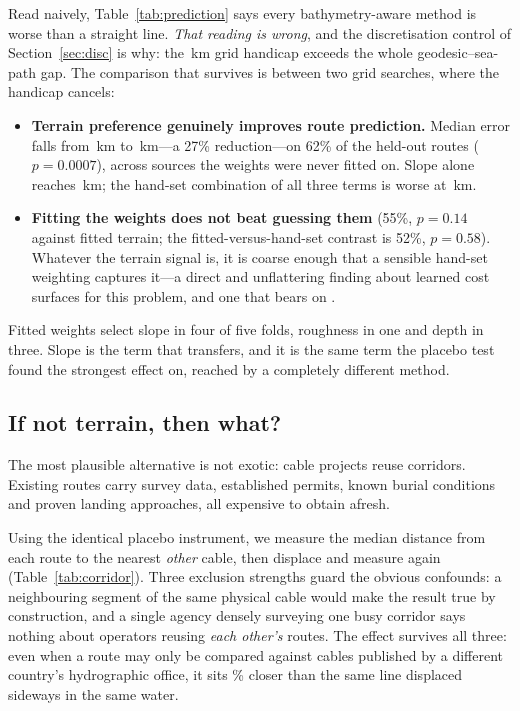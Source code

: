 \documentclass[journal]{IEEEtran}
\begin{document}
Read naively, Table~\ref{tab:prediction} says every bathymetry-aware method is
worse than a straight line. \emph{That reading is wrong}, and the
discretisation control of Section~\ref{sec:disc} is why: the
\nDiscretisation\,km grid handicap exceeds the whole geodesic--sea-path gap.
The comparison that survives is between two grid searches, where the handicap
cancels:

\begin{itemize}
\item \textbf{Terrain preference genuinely improves route prediction.} Median
error falls from \nRegSeapath\,km to \nRegFitted\,km---a 27\% reduction---on
62\% of the \nRegN{} held-out routes ($p=0.0007$), across sources the weights
were never fitted on. Slope alone reaches \nRegSlope\,km; the hand-set
combination of all three terms is worse at \nRegHandset\,km.
\item \textbf{Fitting the weights does not beat guessing them}
(55\%, $p=0.14$ against fitted terrain; the fitted-versus-hand-set contrast is
52\%, $p=0.58$). Whatever the terrain signal is, it is coarse enough that a
sensible hand-set weighting captures it---a direct and unflattering finding
about learned cost surfaces for this problem, and one that bears on
\cite{google_patent_2021}.
\end{itemize}

Fitted weights select slope in four of five folds, roughness in one and depth
in three. Slope is the term that transfers, and it is the same term the placebo
test found the strongest effect on, reached by a completely different method.

\subsection{If not terrain, then what?}\label{sec:corridor}
The most plausible alternative is not exotic: cable projects reuse corridors.
Existing routes carry survey data, established permits, known burial conditions
and proven landing approaches, all expensive to obtain afresh.

Using the identical placebo instrument, we measure the median distance from
each route to the nearest \emph{other} cable, then displace and measure again
(Table~\ref{tab:corridor}). Three exclusion strengths guard the obvious
confounds: a neighbouring segment of the same physical cable would make the
result true by construction, and a single agency densely surveying one busy
corridor says nothing about operators reusing \emph{each other's} routes. The
effect survives all three: even when a route may only be compared against
cables published by a different country's hydrographic office, it sits
\nCorridorRaw\% closer than the same line displaced sideways in the same water.
\end{document}

